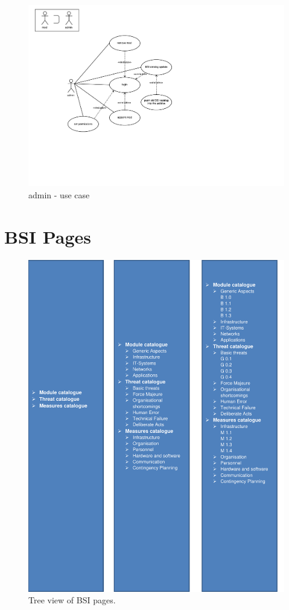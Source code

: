 \begin{figure}[h]  
    \centering
    \includegraphics[scale=1.0]{Pictures/Admin}
    \caption{admin - use case}
\end{figure}
 

\chapter{BSI Pages}
\label{appendix_bsi}

\begin{figure}[h]  
    \centering
    \includegraphics[page=1,width=.8\textwidth]{Pictures/bsi_pages.pdf}
    \caption{Tree view of BSI pages.}
\end{figure}

